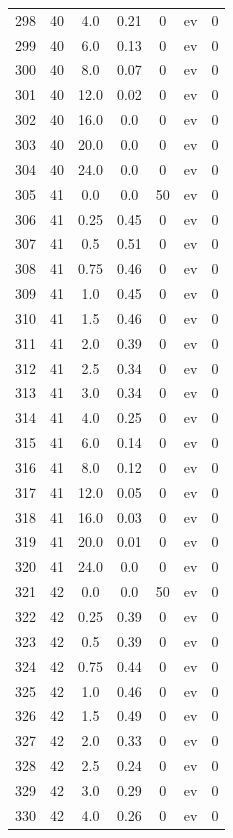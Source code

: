 \documentclass[12pt,a4paper]{article}
\begin{document}
\begin{tabular}{r|cccccc}
	298 & 40 & 4.0 & 0.21 & 0 & ev & 0 \\
	299 & 40 & 6.0 & 0.13 & 0 & ev & 0 \\
	300 & 40 & 8.0 & 0.07 & 0 & ev & 0 \\
	301 & 40 & 12.0 & 0.02 & 0 & ev & 0 \\
	302 & 40 & 16.0 & 0.0 & 0 & ev & 0 \\
	303 & 40 & 20.0 & 0.0 & 0 & ev & 0 \\
	304 & 40 & 24.0 & 0.0 & 0 & ev & 0 \\
	305 & 41 & 0.0 & 0.0 & 50 & ev & 0 \\
	306 & 41 & 0.25 & 0.45 & 0 & ev & 0 \\
	307 & 41 & 0.5 & 0.51 & 0 & ev & 0 \\
	308 & 41 & 0.75 & 0.46 & 0 & ev & 0 \\
	309 & 41 & 1.0 & 0.45 & 0 & ev & 0 \\
	310 & 41 & 1.5 & 0.46 & 0 & ev & 0 \\
	311 & 41 & 2.0 & 0.39 & 0 & ev & 0 \\
	312 & 41 & 2.5 & 0.34 & 0 & ev & 0 \\
	313 & 41 & 3.0 & 0.34 & 0 & ev & 0 \\
	314 & 41 & 4.0 & 0.25 & 0 & ev & 0 \\
	315 & 41 & 6.0 & 0.14 & 0 & ev & 0 \\
	316 & 41 & 8.0 & 0.12 & 0 & ev & 0 \\
	317 & 41 & 12.0 & 0.05 & 0 & ev & 0 \\
	318 & 41 & 16.0 & 0.03 & 0 & ev & 0 \\
	319 & 41 & 20.0 & 0.01 & 0 & ev & 0 \\
	320 & 41 & 24.0 & 0.0 & 0 & ev & 0 \\
	321 & 42 & 0.0 & 0.0 & 50 & ev & 0 \\
	322 & 42 & 0.25 & 0.39 & 0 & ev & 0 \\
	323 & 42 & 0.5 & 0.39 & 0 & ev & 0 \\
	324 & 42 & 0.75 & 0.44 & 0 & ev & 0 \\
	325 & 42 & 1.0 & 0.46 & 0 & ev & 0 \\
	326 & 42 & 1.5 & 0.49 & 0 & ev & 0 \\
	327 & 42 & 2.0 & 0.33 & 0 & ev & 0 \\
	328 & 42 & 2.5 & 0.24 & 0 & ev & 0 \\
	329 & 42 & 3.0 & 0.29 & 0 & ev & 0 \\
	330 & 42 & 4.0 & 0.26 & 0 & ev & 0 \\

\end{tabular}
\end{document}
